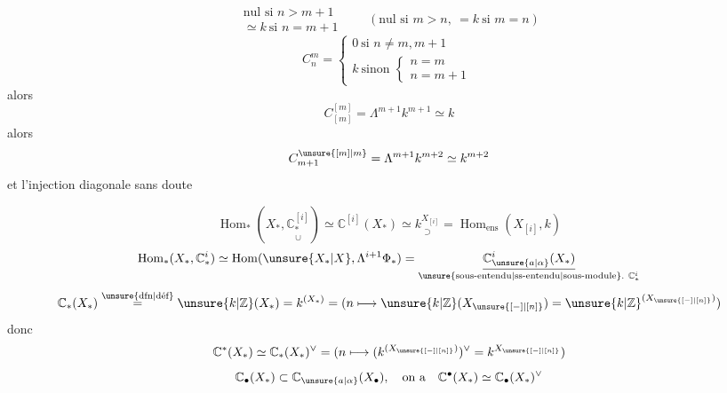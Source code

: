 \[
\begin{gathered}
\text{nul si }n>m+1\\
\simeq k\ \text{si }n=m+1
\end{gathered}
\qquad
(\text{nul si }m>n,\ =k\ \text{si }m=n)
\]
\[
C_n^m=
\begin{cases}
0\ \text{si }n\ne m,m+1\\
k\ \text{sinon }\begin{cases}n=m\\n=m+1\end{cases}
\end{cases}
\]
alors
\[
C_{[m]}^{[m]}=\Lambda^{m+1}k^{m+1}\simeq k
\]
alors
\[
C_{m+1}^{\unsure{[m]|m}}=\Lambda^{m+1}k^{m+2}\simeq k^{m+2}
\]
et  l'injection diagonale sans doute


\[
\operatorname{Hom}_*(X_*,\underset{\cup}{\mathbb C_*^{[i]}})
\simeq\mathbb C^{[i]}(X_*)\simeq\underset{\supset}{k^{X_{[i]}}}
=\operatorname{Hom}_{\mathrm{ens}}(X_{[i]},k)
\]
\[
\operatorname{Hom}_*(X_*,\mathbb C_*^i)\simeq\operatorname{Hom}(\unsure{X_*|X},\Lambda^{i+1}\Phi_*)
=\underset{\text{\unsure{sous-entendu|ss-entendu|sous-module}.}\ \mathbb C_*^i}{\underline{\mathbb C_{\unsure{a|\alpha}}^i(X_*)}}
\]
\[
\mathbb C_*(X_*)\overset{\text{\unsure{dfn|déf}}}{=}\unsure{k|\mathbb Z}(X_*)=k^{(X_*)}
=(n\longmapsto\unsure{k|\mathbb Z}(X_{\unsure{[-]|[n]}})=\unsure{k|\mathbb Z}^{(X_{\unsure{[-]|[n]}})})
\]
donc
\[
\mathbb C^*(X_*)\simeq\mathbb C_*(X_*)^\vee
=(n\longmapsto(k^{(X_{\unsure{[-]|[n]}})})^\vee=k^{X_{\unsure{[-]|[n]}}})
\]
\[
\mathbb C_\bullet(X_*)\subset\mathbb C_{\unsure{a|\alpha}}(X_{\bullet}),\quad
\text{on a}\quad \mathbb C^\bullet(X_*)\simeq \mathbb C_\bullet(X_*)^\vee
\]

